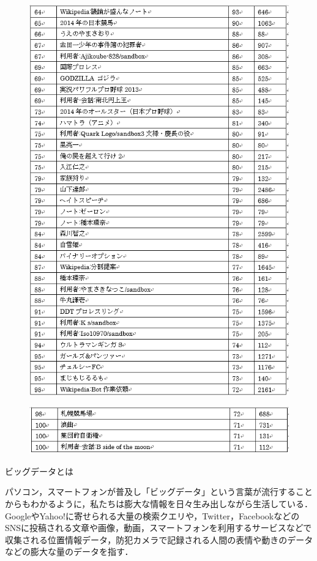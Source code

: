 \begin{figure}[H]
\centering
\includegraphics[width=12cm]{sample8.png}

\end{figure}


\begin{figure}[H]
\centering
\includegraphics[width=12cm]{sample9.png}

\end{figure}

ビッグデータとは

パソコン，スマートフォンが普及し「ビッグデータ」という言葉が流行することからもわかるように，私たちは膨大な情報を日々生み出しながら生活している．GoogleやYahoo!に寄せられる大量の検索クエリや，Twitter，FacebookなどのSNSに投稿される文章や画像，動画，スマートフォンを利用するサービスなどで収集される位置情報データ，防犯カメラで記録される人間の表情や動きのデータなどの膨大な量のデータを指す．

